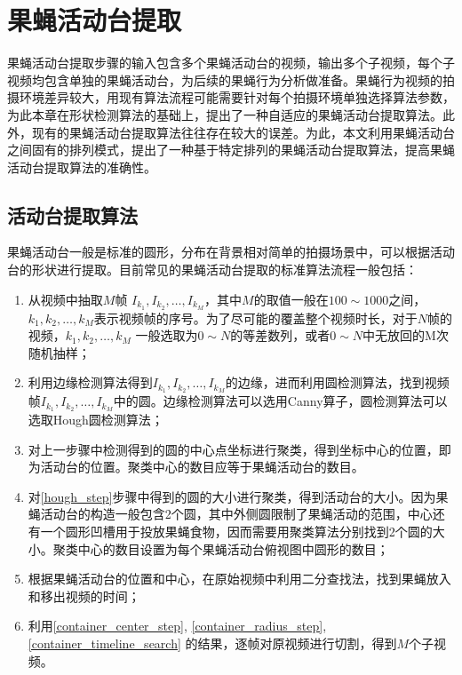 \chapter{果蝇活动台提取}
\label{chapter:container_split}

果蝇活动台提取步骤的输入包含多个果蝇活动台的视频，输出多个子视频，每个子视频均包含单独的果蝇活动台，为后续的果蝇行为分析做准备。果蝇行为视频的拍摄环境差异较大，用现有算法流程可能需要针对每个拍摄环境单独选择算法参数，为此本章在形状检测算法的基础上，提出了一种自适应的果蝇活动台提取算法。此外，现有的果蝇活动台提取算法往往存在较大的误差。为此，本文利用果蝇活动台之间固有的排列模式，提出了一种基于特定排列的果蝇活动台提取算法，提高果蝇活动台提取算法的准确性。

\section{活动台提取算法}\label{sec:container_split}

果蝇活动台一般是标准的圆形，分布在背景相对简单的拍摄场景中，可以根据活动台的形状进行提取。目前常见的果蝇活动台提取的标准算法流程一般包括：

\begin{enumerate}
\item 从视频中抽取$M$帧 $I_{k_1}, I_{k_2}, \ldots, I_{k_M}$，其中$M$的取值一般在$100\sim 1000$之间，$k_1, k_2, \ldots, k_M$表示视频帧的序号。为了尽可能的覆盖整个视频时长，对于$N$帧的视频，$k_1, k_2, \ldots, k_M$ 一般选取为$0\sim N$的等差数列，或者$0\sim N$中无放回的M次随机抽样；
\item \label{hough_step} 利用边缘检测算法得到$I_{k_1}, I_{k_2}, \ldots, I_{k_M}$的边缘，进而利用圆检测算法，找到视频帧$I_{k_1}, I_{k_2}, \ldots, I_{k_M}$中的圆。边缘检测算法可以选用Canny算子\cite{canny1986computational}，圆检测算法可以选取Hough圆检测算法\cite{hough_circle_1990}；
\item \label{container_center_step}对上一步骤中检测得到的圆的中心点坐标进行聚类，得到坐标中心的位置，即为活动台的位置。聚类中心的数目应等于果蝇活动台的数目。
\item \label{container_radius_step} 对\ref{hough_step}步骤中得到的圆的大小进行聚类，得到活动台的大小。因为果蝇活动台的构造一般包含2个圆，其中外侧圆限制了果蝇活动的范围，中心还有一个圆形凹槽用于投放果蝇食物，因而需要用聚类算法分别找到2个圆的大小。聚类中心的数目设置为每个果蝇活动台俯视图中圆形的数目；
\item \label{container_timeline_search}根据果蝇活动台的位置和中心，在原始视频中利用二分查找法，找到果蝇放入和移出视频的时间；
\item 利用\ref{container_center_step}, \ref{container_radius_step}, \ref{container_timeline_search} 的结果，逐帧对原视频进行切割，得到$M$个子视频。
\end{enumerate}

